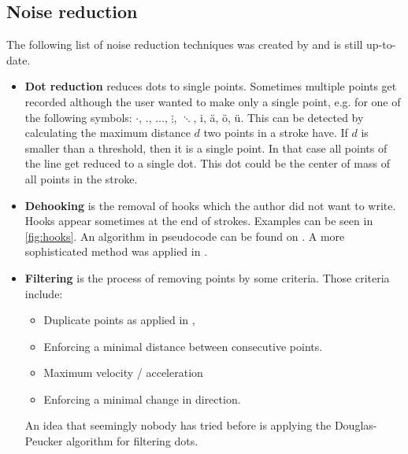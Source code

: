 \subsection{Noise reduction}
The following list of noise reduction techniques was created by \cite{Tappert90}
and is still up-to-date.
\begin{itemize}
    \item \textbf{Dot reduction} reduces dots to single points. Sometimes
          multiple points get recorded although the user wanted to make only
          a single point, e.g. for one of the following symbols:
          $\cdot$, ., $\dots$, $\vdots$, $\ddots$, i, ä, ö, ü.
          This can be detected by calculating
          the maximum distance $d$ two points in a stroke have. If $d$ is
          smaller than a threshold, then it is a single point.
          In that case all points of the line get reduced to a single dot.
          This dot could be the center of mass of all points in the stroke.
    \item \textbf{Dehooking} is the removal of hooks which the author did not
          want to write. Hooks appear sometimes at the end of strokes.
          Examples can be seen in \cref{fig:hooks}. An algorithm in pseudocode
          can be found on . A more sophisticated method
          was applied in \cite{Huang09}.
    \item \textbf{Filtering} is the process of removing points by some criteria.
          Those criteria include:
          \begin{itemize}
              \item Duplicate points as applied in \cite{Huang09,Guerfali93},
              \item Enforcing a minimal distance between consecutive 
                    points\cite{Tappert90}.
              \item Maximum velocity / acceleration\cite{Division87}
              \item Enforcing a minimal change in direction\cite{Tappert90}.
          \end{itemize}
          An idea that seemingly nobody has tried before is applying the
          Douglas-Peucker algorithm for filtering dots.


\end{itemize}
